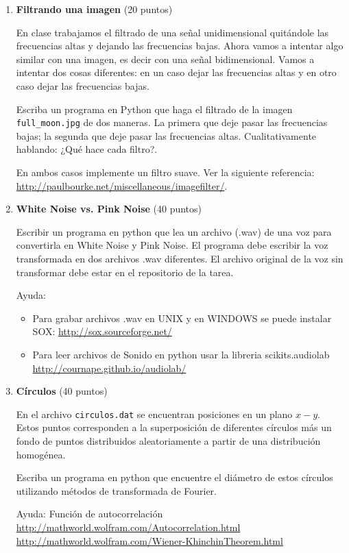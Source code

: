 \documentclass{article}
\begin{document}
\begin{enumerate}

\item {\bf Filtrando una imagen} (20 puntos) 

En clase trabajamos el filtrado de una se\~nal unidimensional
quit\'andole las frecuencias altas y dejando las frecuencias
bajas. Ahora vamos a intentar algo similar con una imagen, es decir con
una se\~nal bidimensional. Vamos a intentar dos cosas
diferentes: en un caso dejar las frecuencias altas y en otro caso
dejar las frecuencias bajas.

Escriba un programa en Python que haga el filtrado de la imagen
\verb"full_moon.jpg" de dos maneras. La primera que deje pasar las
frecuencias bajas; la segunda que deje pasar las frecuencias
altas. Cualitativamente hablando: ¿Qué hace cada filtro?.

En ambos casos implemente un filtro suave. Ver la siguiente
referencia: \url{http://paulbourke.net/miscellaneous/imagefilter/}. 


\item {\bf White Noise vs. Pink Noise} (40 puntos)
 
Escribir un programa en python que lea un archivo (.wav) de una
voz para convertirla en White Noise y Pink Noise. El programa debe
escribir la voz transformada en dos archivos .wav diferentes. El
archivo original de la voz sin transformar debe estar en el
repositorio de la tarea.


Ayuda:
\begin{itemize}
\item Para grabar archivos .wav en UNIX y en WINDOWS  se puede
  instalar SOX:
  \url{http://sox.sourceforge.net/}
  
\item 
  Para leer archivos de Sonido en python usar la libreria
  scikits.audiolab
 \url{http://cournape.github.io/audiolab/}
\end{itemize}


\item {\bf C\'irculos} (40 puntos)

En el archivo \verb"circulos.dat" se encuentran posiciones en un plano
$x-y$. Estos puntos corresponden a la superposici\'on de diferentes
c\'irculos m\'as un fondo de puntos distribuidos aleatoriamente a
partir de una distribuci\'on homog\'enea. 

Escriba un programa en python que encuentre el di\'ametro de estos
c\'irculos utilizando m\'etodos de transformada de Fourier.

Ayuda:
Funci\'on de autocorrelaci\'on \\ 
\url{http://mathworld.wolfram.com/Autocorrelation.html}\\
\url{http://mathworld.wolfram.com/Wiener-KhinchinTheorem.html}\\

\end{enumerate}
\end{document}
